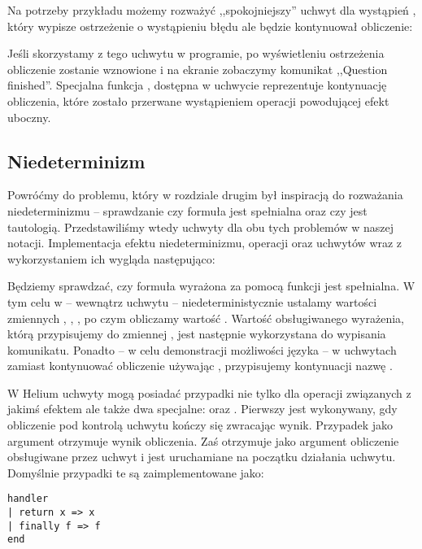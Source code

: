 Na potrzeby przykładu możemy rozważyć ,,spokojniejszy'' uchwyt dla wystąpień , który wypisze ostrzeżenie o wystąpieniu błędu ale będzie kontynuował obliczenie:



Jeśli skorzystamy z tego uchwytu w programie, po wyświetleniu ostrzeżenia obliczenie  zostanie wznowione i na ekranie zobaczymy komunikat ,,Question finished''. Specjalna funkcja , dostępna w uchwycie reprezentuje kontynuację obliczenia, które zostało przerwane wystąpieniem operacji powodującej efekt uboczny.

\subsection{Niedeterminizm}

Powróćmy do problemu, który w rozdziale drugim był inspiracją do rozważania niedeterminizmu -- sprawdzanie czy formuła jest spełnialna oraz czy jest tautologią. Przedstawiliśmy wtedy uchwyty dla obu tych problemów w naszej notacji. Implementacja efektu niedeterminizmu, operacji  oraz uchwytów wraz z wykorzystaniem ich wygląda następująco:



Będziemy sprawdzać, czy formuła wyrażona za pomocą funkcji  jest spełnialna. W tym celu w  -- wewnątrz uchwytu -- niedeterministycznie ustalamy wartości zmiennych , , , po czym obliczamy wartość . Wartość obsługiwanego wyrażenia, którą przypisujemy do zmiennej , jest następnie wykorzystana do wypisania komunikatu. Ponadto -- w celu demonstracji możliwości języka -- w uchwytach zamiast kontynuować obliczenie używając , przypisujemy kontynuacji nazwę .

W Helium uchwyty mogą posiadać przypadki nie tylko dla operacji związanych z jakimś efektem ale także dwa specjalne:  oraz . Pierwszy jest wykonywany, gdy obliczenie pod kontrolą uchwytu kończy się zwracając wynik. Przypadek  jako argument otrzymuje wynik obliczenia. Zaś  otrzymuje jako argument obliczenie obsługiwane przez uchwyt i jest uruchamiane na początku działania uchwytu. Domyślnie przypadki te są zaimplementowane jako:

\begin{lstlisting}
handler
| return x => x
| finally f => f
end
\end{lstlisting}

